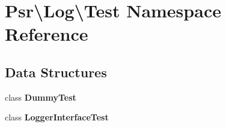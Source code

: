 \section{Psr\textbackslash{}Log\textbackslash{}Test Namespace Reference}
\label{namespace_psr_1_1_log_1_1_test}
\subsection*{Data Structures}
\begin{DoxyCompactItemize}
\item 
class {\bf Dummy\+Test}
\item 
class {\bf Logger\+Interface\+Test}
\end{DoxyCompactItemize}

